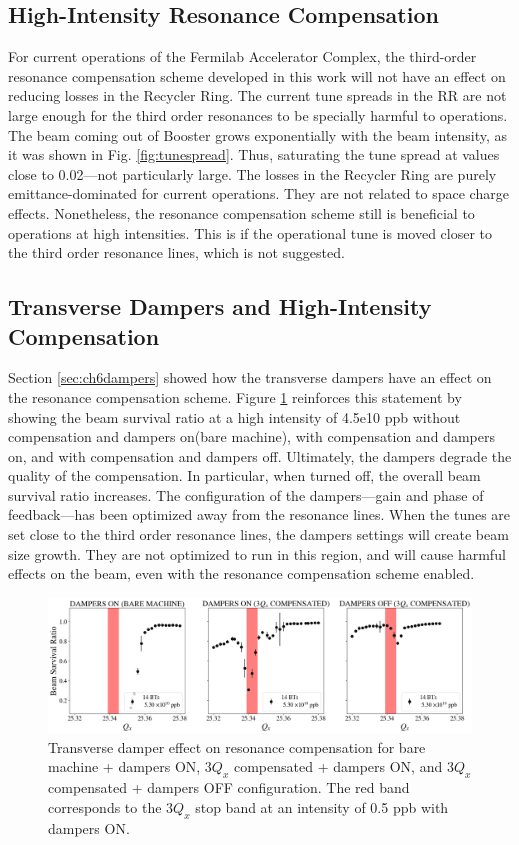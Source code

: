 \subsection{High-Intensity Resonance Compensation}

For current operations of the Fermilab Accelerator Complex, the third-order resonance compensation scheme developed in this work will not have an effect on reducing losses in the Recycler Ring. The current tune spreads in the RR are not large enough for the third order resonances to be specially harmful to operations. The beam coming out of Booster grows exponentially with the beam intensity, as it was shown in Fig. \ref{fig:tunespread}. Thus, saturating the tune spread at values close to 0.02---not particularly large. The losses in the Recycler Ring are purely emittance-dominated for current operations. They are not related to space charge effects. Nonetheless, the resonance compensation scheme still is beneficial to operations at high intensities. This is if the operational tune is moved closer to the third order resonance lines, which is not suggested.  

\subsection{Transverse Dampers and High-Intensity Compensation}

Section \ref{sec:ch6dampers} showed how the transverse dampers have an effect on the resonance compensation scheme. Figure \ref{fig:dampers7} reinforces this statement by showing the beam survival ratio at a high intensity of 4.5e10 ppb without compensation and dampers on(bare machine), with compensation and dampers on, and with compensation and dampers off. Ultimately, the dampers degrade the quality of the compensation. In particular, when turned off, the overall beam survival ratio increases. The configuration of the dampers---gain and phase of feedback---has been optimized away from the resonance lines. When the tunes are set close to the third order resonance lines, the dampers settings will create beam size growth. They are not optimized to run in this region, and will cause harmful effects on the beam, even with the resonance compensation scheme enabled.

\begin{figure}[H]
    \centering
    \includegraphics[width=\columnwidth]{chapter7/dampers_config.png}
    \caption{Transverse damper effect on resonance compensation for bare machine + dampers ON, $3Q_x$ compensated + dampers ON, and $3Q_x$ compensated + dampers OFF configuration. The red band corresponds to the $3Q_x$ stop band at an intensity of 0.5 ppb with dampers ON.}
    \label{fig:dampers7}
\end{figure}


